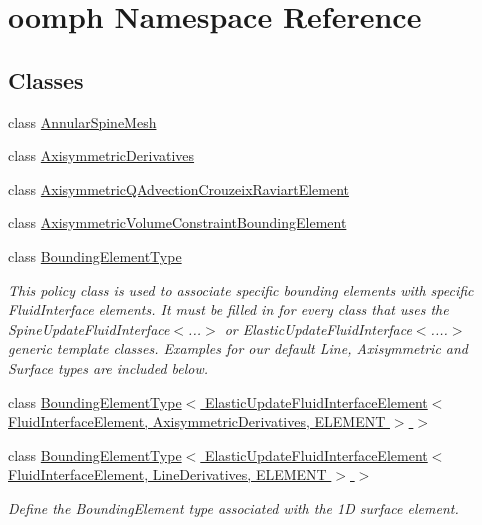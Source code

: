 \hypertarget{namespaceoomph}{}\section{oomph Namespace Reference}
\label{namespaceoomph}
\subsection*{Classes}
\begin{DoxyCompactItemize}
\item 
class \hyperlink{classoomph_1_1AnnularSpineMesh}{Annular\+Spine\+Mesh}
\item 
class \hyperlink{classoomph_1_1AxisymmetricDerivatives}{Axisymmetric\+Derivatives}
\item 
class \hyperlink{classoomph_1_1AxisymmetricQAdvectionCrouzeixRaviartElement}{Axisymmetric\+Q\+Advection\+Crouzeix\+Raviart\+Element}
\item 
class \hyperlink{classoomph_1_1AxisymmetricVolumeConstraintBoundingElement}{Axisymmetric\+Volume\+Constraint\+Bounding\+Element}
\item 
class \hyperlink{classoomph_1_1BoundingElementType}{Bounding\+Element\+Type}
\begin{DoxyCompactList}\small\item\em This policy class is used to associate specific bounding elements with specific Fluid\+Interface elements. It must be filled in for every class that uses the Spine\+Update\+Fluid\+Interface$<$...$>$ or Elastic\+Update\+Fluid\+Interface$<$....$>$ generic template classes. Examples for our default Line, Axisymmetric and Surface types are included below. \end{DoxyCompactList}\item 
class \hyperlink{classoomph_1_1BoundingElementType_3_01ElasticUpdateFluidInterfaceElement_3_01FluidInterfaceEleme3184fbb3565ba21902c1c3c09e7b1c72}{Bounding\+Element\+Type$<$ Elastic\+Update\+Fluid\+Interface\+Element$<$ Fluid\+Interface\+Element, Axisymmetric\+Derivatives, E\+L\+E\+M\+E\+N\+T $>$ $>$}
\item 
class \hyperlink{classoomph_1_1BoundingElementType_3_01ElasticUpdateFluidInterfaceElement_3_01FluidInterfaceEleme25258208c656cd18bb5e78a946d0c1ca}{Bounding\+Element\+Type$<$ Elastic\+Update\+Fluid\+Interface\+Element$<$ Fluid\+Interface\+Element, Line\+Derivatives, E\+L\+E\+M\+E\+N\+T $>$ $>$}
\begin{DoxyCompactList}\small\item\em Define the Bounding\+Element type associated with the 1D surface element. \end{DoxyCompactList}\item 

\end{DoxyCompactItemize}
